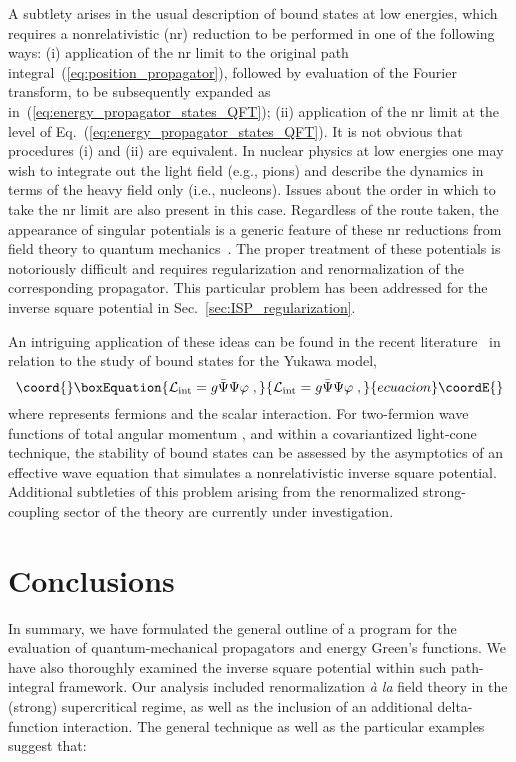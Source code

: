\documentclass[a4paper,preprint,draft,showpacs,amsmath,amsfonts,amssymb,aps,prd]{revtex4}%
\begin{document}
A subtlety arises in
the usual description of bound states at low energies, which requires a
nonrelativistic (nr) reduction to be performed in 
one of the following ways:
(i) application of the nr limit
to the original path integral~(\ref{eq:position_propagator}),
followed by evaluation of the Fourier transform, to be
subsequently expanded as in~(\ref{eq:energy_propagator_states_QFT});
(ii) application of the nr limit
at the level of Eq.~(\ref{eq:energy_propagator_states_QFT}).
It is not obvious that procedures (i) and (ii) are equivalent.
In nuclear physics at low energies one may wish
to integrate out the light field 
(e.g., pions) and describe the dynamics in terms of the heavy field only (i.e.,
nucleons). Issues about the order in which to take the nr limit are also
present in this case. 
Regardless of the route taken, the appearance of
singular potentials is a generic feature of these nr reductions from field
theory to quantum mechanics~\cite{Stevenson,Beane}. 
The proper treatment
of these potentials is notoriously difficult and requires regularization and
renormalization of the corresponding  propagator.
This particular problem has been addressed for the inverse square potential in
Sec.~\ref{sec:ISP_regularization}.

An intriguing application of these ideas can be found in the recent 
literature~\cite{car:01}
 in relation to the study
of bound states for the Yukawa model,
\begin{equation}\coord{}\boxEquation{
{\cal L}_{\rm int}
=
g \bar{\Psi} \Psi 
\varphi
\;  ,
}{
{\cal L}_{\rm int}
=
g \bar{\Psi} \Psi 
\varphi
\;  ,
}{ecuacion}\coordE{}\end{equation}
where \myHighlight{$\Psi$}\coordHE{} represents
fermions and \myHighlight{$\varphi$}\coordHE{} the scalar interaction. 
For two-fermion wave functions of total angular momentum
\coordHE{},
and within a covariantized light-cone
technique,  the stability of  bound states can be assessed
by the asymptotics of an effective wave equation that  simulates a
nonrelativistic inverse square potential.
Additional subtleties 
of this problem arising from the renormalized strong-coupling
sector of the theory are currently under investigation.



\section{Conclusions}
\label{sec:conclusions}


In summary, we have formulated the general outline of a program for the evaluation 
of quantum-mechanical propagators and energy Green's functions.
We have also thoroughly examined the inverse square potential
within such path-integral framework.
Our analysis included renormalization {\it \`{a} la\/} field theory
in the (strong) supercritical regime, as well as the inclusion of an additional
delta-function interaction.
The general technique as well as the particular examples
suggest that: 
\end{document}
